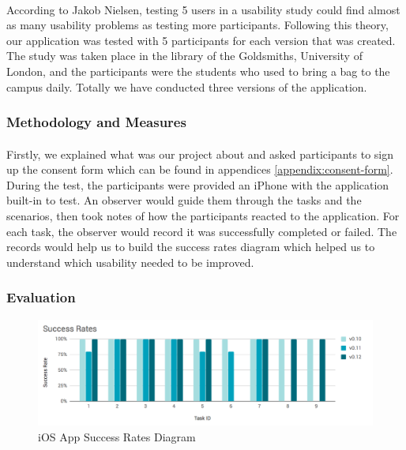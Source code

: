 \documentclass[12pt,a4paper]{article}
\begin{document}
          \paragraph{} According to Jakob Nielsen, testing 5 users in a usability study could find almost as many usability problems as testing more participants\cite{HowManyTestUsers}. Following this theory, our application was tested with 5 participants for each version that was created. The study was taken place in the library of the Goldsmiths, University of London, and the participants were the students who used to bring a bag to the campus daily. Totally we have conducted three versions of the application.
          
        \subsubsection{Methodology and Measures}
          \paragraph{} Firstly, we explained what was our project about and asked participants to sign up the consent form which can be found in appendices \ref{appendix:consent-form}. During the test, the participants were provided an iPhone with the application built-in to test. An observer would guide them through the tasks and the scenarios, then took notes of how the participants reacted to the application. For each task, the observer would record it was successfully completed or failed. The records would help us to build the success rates diagram which helped us to understand which usability needed to be improved\cite{SuccessRates}. 
        
        \subsubsection{Evaluation}
          
          \begin{figure}[H]
            \centering
            \includegraphics[width=1\textwidth]{../assets/usability-test-success-rates.png}
            \caption{iOS App Success Rates Diagram}
            \label{fig:iOS App Success Rates Diagram}
          \end{figure}
\end{document}
